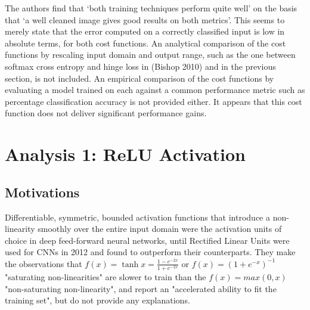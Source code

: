 \documentclass[a4paper,11pt]{article}
\begin{document}
The authors find that `both training techniques perform quite well' on the basis that `a well cleaned image gives good results on both metrics'. This seems to merely state that the error computed on a correctly classified input is low in absolute terms, for both cost functions. An analytical comparison of the cost functions by rescaling input domain and output range, such as the one between softmax cross entropy and hinge loss in (Bishop 2010) \cite{ML-book} and in the previous section, is not included. An empirical comparison of the cost functions by evaluating a model trained on each against a common performance metric such as percentage classification accuracy is not provided either. It appears that this cost function does not deliver significant performance gains.

\clearpage

\section{Analysis 1: ReLU Activation}

\subsection{Motivations}

Differentiable, symmetric, bounded activation functions that introduce a non-linearity smoothly over the entire input domain were the activation units of choice in deep feed-forward neural networks, until Rectified Linear Units were used for CNNs in 2012 \cite{krizhevsky} and found to outperform their counterparts. They make the observations that $f(x) = \tanh x = \frac{1 - e^{-2x}}{1 + e^{-2x}}$ or $f(x) = (1+ e^{-x})^{-1}$ "saturating non-linearities" are slower to train than the $f(x) = max(0,x)$ "non-saturating non-linearity", and report an "accelerated ability to fit the training set", but do not provide any explanations.   \\
\end{document}
